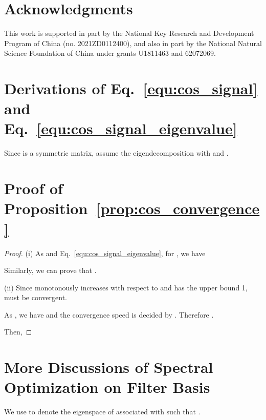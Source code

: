 \documentclass[nohyperref]{article}
\theoremstyle{plain}
\theoremstyle{definition}
\theoremstyle{remark}
\begin{document}
\section*{Acknowledgments}

This work is supported in part by the National Key Research and Development Program of China (no. 2021ZD0112400), and also in part by the National Natural Science Foundation of China under grants U1811463 and 62072069.


\nocite{langley00}






\newpage
\appendix
\onecolumn



\section{Derivations of Eq.~\ref{equ:cos_signal} and Eq.~\ref{equ:cos_signal_eigenvalue}}
\label{deriv:equ:cos_signal_eigenvalue}

Since  is a symmetric matrix, assume the eigendecomposition  with  and .





\section{Proof of Proposition~\ref{prop:cos_convergence}}
\label{proof:prop:cos_convergence}

\begin{proof}
	(i)
	As  and Eq.~\ref{equ:cos_signal_eigenvalue}, for , we have
	
	Similarly, we can prove that .
	
	(ii)
	Since  monotonously increases with respect to  and has the upper bound 1,  must be convergent.
	
	As , we have  and the convergence speed is decided by .
	Therefore .
	
	
	Then, 
	
\end{proof}


\section{More Discussions of Spectral Optimization on Filter Basis}
\label{more_filter_basis}

We use  to denote the eigenspace of  associated with  such that .
\end{document}
